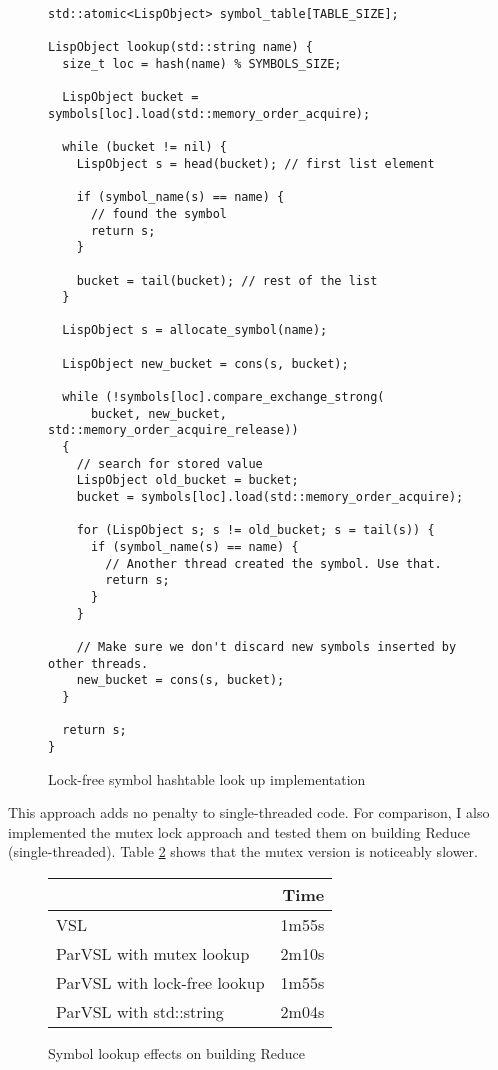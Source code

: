 \begin{figure}
\begin{verbatim}
std::atomic<LispObject> symbol_table[TABLE_SIZE];

LispObject lookup(std::string name) {
  size_t loc = hash(name) % SYMBOLS_SIZE;

  LispObject bucket = symbols[loc].load(std::memory_order_acquire);

  while (bucket != nil) {
    LispObject s = head(bucket); // first list element

    if (symbol_name(s) == name) {
      // found the symbol
      return s;
    }

    bucket = tail(bucket); // rest of the list
  }

  LispObject s = allocate_symbol(name);

  LispObject new_bucket = cons(s, bucket);

  while (!symbols[loc].compare_exchange_strong(
      bucket, new_bucket, std::memory_order_acquire_release))
  {
    // search for stored value
    LispObject old_bucket = bucket;
    bucket = symbols[loc].load(std::memory_order_acquire);

    for (LispObject s; s != old_bucket; s = tail(s)) {
      if (symbol_name(s) == name) {
        // Another thread created the symbol. Use that.
        return s;
      }
    }

    // Make sure we don't discard new symbols inserted by other threads.
    new_bucket = cons(s, bucket);
  }

  return s;
}
\end{verbatim}
\caption{Lock-free symbol hashtable look up implementation}
\label{code:lockfree}
\end{figure}

This approach adds no penalty to single-threaded
code. For comparison, I also implemented the mutex lock approach and tested
them on building Reduce (single-threaded). Table \ref{fig:lockfree} shows that the mutex
version is noticeably slower.

\begin{figure}
  \centering
  \begin{tabular}{lr}
                               & Time \\
  \hline
  VSL                          & 1m55s \\
  ParVSL with mutex lookup     & 2m10s \\
  ParVSL with lock-free lookup & 1m55s \\
  ParVSL with std::string      & 2m04s
  \end{tabular}
  \label{fig:lockfree}
  \caption{Symbol lookup effects on building Reduce}
\end{figure}

